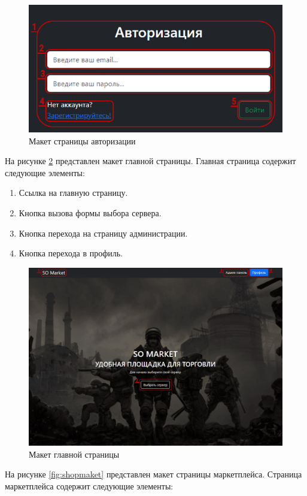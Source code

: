 \begin{figure}
	\centering
	\includegraphics[width=0.7\linewidth]{images/log_maket}
	\caption{Макет страницы авторизации}
	\label{fig:logmaket}
\end{figure}

На рисунке \ref{fig:mainmaket} представлен макет главной страницы. Главная страница содержит следующие элементы:

\begin{enumerate}
	\item Ссылка на главную страницу.
	\item Кнопка вызова формы выбора сервера.
	\item Кнопка перехода на страницу администрации.
	\item Кнопка перехода в профиль.
\end{enumerate}

\begin{figure}
	\centering
	\includegraphics[width=0.7\linewidth]{images/main_maket}
	\caption{Макет главной страницы}
	\label{fig:mainmaket}
\end{figure}

На рисунке \ref{fig:shopmaket} представлен макет страницы маркетплейса. Страница маркетплейса содержит следующие элементы:

